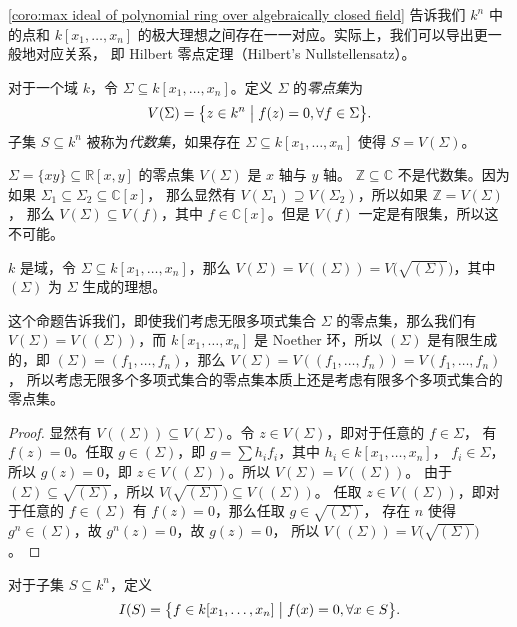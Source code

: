 \autoref{coro:max ideal of polynomial ring over algebraically closed field} 告诉我们
$k^n$ 中的点和 $k[x_1,\dots,x_n]$ 的极大理想之间存在一一对应。实际上，我们可以导出更一般地对应关系，
即 Hilbert 零点定理（Hilbert's Nullstellensatz）。

对于一个域 $k$，令 $\Sigma\subseteq k[x_1,\dots,x_n]$。定义 $\Sigma$ 的\emph{零点集}为
\[
  V(\Sigma)=\bigl\{z\in k^n\bigm| f(z)=0,\forall f\in\Sigma\bigr\}.
\]
子集 $S\subseteq k^n$ 被称为\emph{代数集}，如果存在 $\Sigma\subseteq k[x_1,\dots,x_n]$ 使得
$S=V(\Sigma)$。

\begin{example}
  $\Sigma=\{xy\}\subseteq\mathbb{R}[x,y]$ 的零点集 $V(\Sigma)$ 是 $x$ 轴与 $y$ 轴。
  $\mathbb{Z}\subseteq\mathbb{C}$ 不是代数集。因为如果 $\Sigma_1\subseteq\Sigma_2\subseteq\mathbb{C}[x]$，
  那么显然有 $V(\Sigma_1)\supseteq V(\Sigma_2)$，所以如果 $\mathbb{Z}=V(\Sigma)$，
  那么 $V(\Sigma)\subseteq V(f)$，其中 $f\in\mathbb{C}[x]$。但是 $V(f)$ 一定是有限集，所以这不可能。
\end{example}

\begin{proposition}[零点集的性质]
  $k$ 是域，令 $\Sigma\subseteq k[x_1,\dots,x_n]$，那么
  $V(\Sigma)=V((\Sigma))=V\bigl(\sqrt{(\Sigma)}\bigr)$，其中 $(\Sigma)$ 为 $\Sigma$ 生成的理想。
\end{proposition}
\begin{remark}
  这个命题告诉我们，即使我们考虑无限多项式集合 $\Sigma$ 的零点集，那么我们有
  $V(\Sigma)=V((\Sigma))$，而 $k[x_1,\dots,x_n]$ 是 Noether 环，所以 $(\Sigma)$
  是有限生成的，即 $(\Sigma)=(f_1,\dots,f_n)$，那么 $V(\Sigma)=V((f_1,\dots,f_n))=V(f_1,\dots,f_n)$，
  所以考虑无限多个多项式集合的零点集本质上还是考虑有限多个多项式集合的零点集。
\end{remark}
\begin{proof}
  显然有 $V((\Sigma))\subseteq V(\Sigma)$。令 $z\in V(\Sigma)$，即对于任意的 $f\in\Sigma$，
  有 $f(z)=0$。任取 $g\in (\Sigma)$，即 $g=\sum h_if_i$，其中 $h_i\in k[x_1,\dots,x_n]$，
  $f_i\in\Sigma$，所以 $g(z)=0$，即 $z\in V((\Sigma))$。所以 $V(\Sigma)=V((\Sigma))$。
  由于 $(\Sigma)\subseteq \sqrt{(\Sigma)}$，所以 $V\bigl(\sqrt{(\Sigma)}\bigr)\subseteq V((\Sigma))$。
  任取 $z\in V((\Sigma))$，即对于任意的 $f\in (\Sigma)$ 有 $f(z)=0$，那么任取 $g\in\sqrt{(\Sigma)}$，
  存在 $n$ 使得 $g^n\in (\Sigma)$，故 $g^n(z)=0$，故 $g(z)=0$，
  所以 $V((\Sigma))=V\bigl(\sqrt{(\Sigma)}\bigr)$。
\end{proof}

对于子集 $S\subseteq k^n$，定义
\[
  I(S)=\bigl\{f\in k[x_1,\dots,x_n]\bigm| f(x)=0,\forall x\in S\bigr\}.
\]

